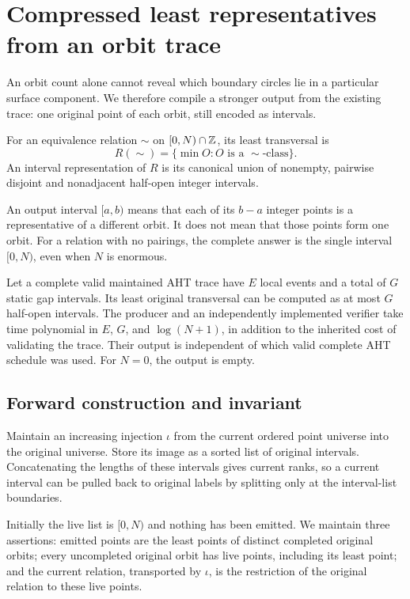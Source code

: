 \section{Compressed least representatives from an orbit trace}
\label{sec:transversal}

An orbit count alone cannot reveal which boundary circles lie in a particular
surface component. We therefore compile a stronger output from the existing
trace: one original point of each orbit, still encoded as intervals.

\begin{definition}
For an equivalence relation $\sim$ on $[0,N)\cap\mathbb Z$, its least transversal is
\[
 R(\sim)=\{\min O:O\text{ is a }\sim\text{-class}\}.
\]
An interval representation of $R$ is its canonical union of nonempty,
pairwise disjoint and nonadjacent half-open integer intervals.
\end{definition}

An output interval $[a,b)$ means that each of its $b-a$ integer points is a
representative of a different orbit. It does not mean that those points form
one orbit. For a relation with no pairings, the complete answer is the single
interval $[0,N)$, even when $N$ is enormous.

\begin{theorem}
\label{thm:transversal}
Let a complete valid maintained AHT trace have $E$ local events and a total
of $G$ static gap intervals. Its least original transversal can be computed
as at most $G$ half-open intervals. The producer and an independently
implemented verifier take time polynomial in $E$, $G$, and
$\log(N+1)$, in addition to the inherited cost of validating the trace.
Their output is independent of which valid complete AHT schedule was used.
For $N=0$, the output is empty.
\end{theorem}

\subsection{Forward construction and invariant}

Maintain an increasing injection $\iota$ from the current ordered point
universe into the original universe. Store its image as a sorted list of
original intervals. Concatenating the lengths of these intervals gives
current ranks, so a current interval can be pulled back to original labels
by splitting only at the interval-list boundaries.

Initially the live list is $[0,N)$ and nothing has been emitted. We maintain
three assertions: emitted points are the least points of distinct completed
original orbits; every uncompleted original orbit has live points, including
its least point; and the current relation, transported by $\iota$, is the
restriction of the original relation to these live points.

